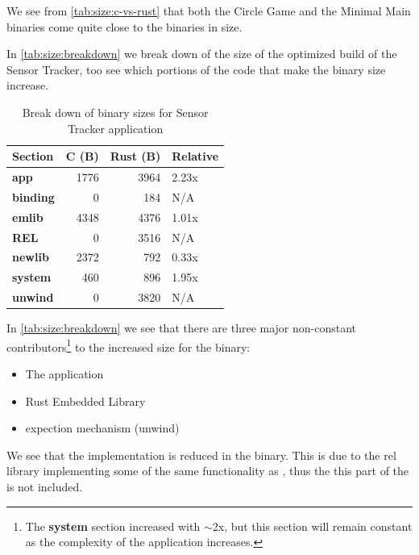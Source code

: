 We see from \autoref{tab:size:c-vs-rust} that both the Circle Game and the Minimal Main  {\rust} binaries come quite close to the {\C} binaries in size.

In \autoref{tab:size:breakdown} we break down of the size of the optimized build of the Sensor Tracker, too see which portions of the {\rust} code that make the binary size increase.

\begin{table}[H]
  \centering
  \begin{tabular}{l|r|r|l}
    \textbf{Section}      & \textbf{C (B)} & \textbf{Rust (B)} & \textbf{Relative} \\
    \hline
    \textbf{app}          & 1776 & 3964 & 2.23x \\
    \textbf{binding}      & 0    & 184  & N/A  \\
    \textbf{emlib}        & 4348 & 4376 & 1.01x \\
    \textbf{REL}          & 0    & 3516 & N/A  \\
    \textbf{newlib}       & 2372 & 792  & 0.33x \\
    \textbf{system}       & 460  & 896  & 1.95x \\
    \textbf{unwind}       & 0    & 3820 & N/A  \\
    \hline
  \end{tabular}
  \caption{Break down of binary sizes for Sensor Tracker application}
  \label{tab:size:breakdown}
\end{table}

In \autoref{tab:size:breakdown} we see that there are three major non-constant contributors\footnote{The \textbf{system} section increased with $\sim$2x, but this section will remain constant as the complexity of the application increases.} to the increased size for the {\rust} binary:

\begin{itemize}
\item The application
\item Rust Embedded Library
\item {\rust} expection mechanism (unwind)
\end{itemize}

We see that the  implementation is reduced in the {\rust} binary.
This is due to the \gls{rel} library implementing some of the same functionality as , thus the this part of the  is not included.


